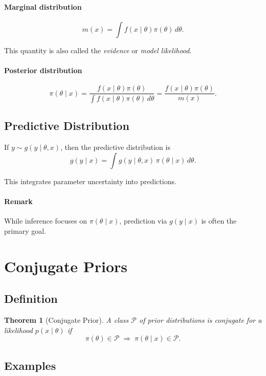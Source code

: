 \documentclass[12pt,oneside]{book}
\numberwithin{equation}{section}
\theoremstyle{definition}
\theoremstyle{plain}
\newtheorem{theorem}{Theorem}[section]
\theoremstyle{remark}
\begin{document}
\paragraph{Marginal distribution}
\[
m(x) = \int f(x \mid \theta)\pi(\theta)\, d\theta.
\]

This quantity is also called the \emph{evidence} or \emph{model likelihood}.

\paragraph{Posterior distribution}
\[
\pi(\theta \mid x)
= \frac{f(x \mid \theta)\pi(\theta)}{\int f(x \mid \theta)\pi(\theta)\, d\theta}
= \frac{f(x \mid \theta)\pi(\theta)}{m(x)}.
\]

\subsection{Predictive Distribution}

If $y \sim g(y \mid \theta, x)$, then the predictive distribution is
\[
g(y \mid x) = \int g(y \mid \theta, x)\, \pi(\theta \mid x)\, d\theta.
\]

This integrates parameter uncertainty into predictions.

\paragraph{Remark}
While inference focuses on $\pi(\theta \mid x)$, prediction via $g(y \mid x)$ is often the primary goal.

\section{Conjugate Priors}

\subsection{Definition}

\begin{theorem}[Conjugate Prior]
A class $\mathcal{P}$ of prior distributions is conjugate for a likelihood $p(x \mid \theta)$ if
\[
\pi(\theta) \in \mathcal{P} \;\Rightarrow\; \pi(\theta \mid x) \in \mathcal{P}.
\]
\end{theorem}

\subsection*{Examples}
\end{document}
